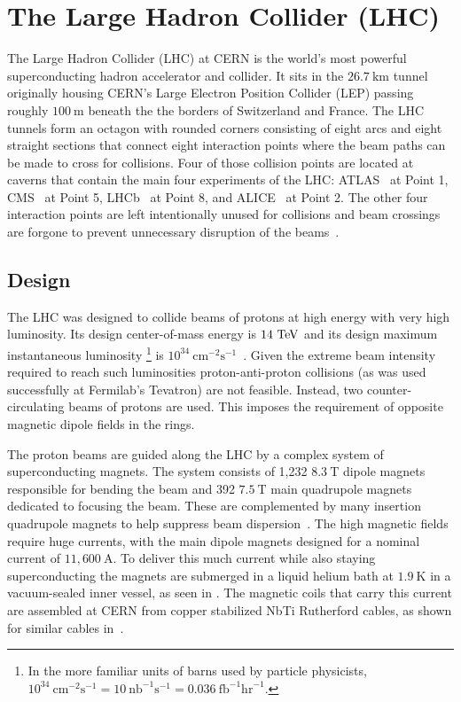 \chapter{The Large Hadron Collider (LHC)}\label{chapter:LHC}

The Large Hadron Collider (\Gls{LHC}) at CERN is the world's most powerful superconducting hadron accelerator and collider.
It sits in the $26.7~\mathrm{km}$ tunnel originally housing CERN's Large Electron Position Collider (LEP) passing roughly $100~\mathrm{m}$ beneath the the borders of Switzerland and France.
The LHC tunnels form an octagon with rounded corners consisting of eight arcs and eight straight sections that connect eight \glspl{interaction point} where the beam paths can be made to cross for collisions.
Four of those collision points are located at caverns that contain the main four experiments of the LHC: ATLAS~\cite{PERF-2007-01} at Point 1, CMS~\cite{CMS:2008} at Point 5, LHCb~\cite{LHCb:2008} at Point 8, and ALICE~\cite{ALICE:2008} at Point 2.
The other four interaction points are left intentionally unused for collisions and beam crossings are forgone to prevent unnecessary disruption of the beams~\cite{Evans:2008}.

\section{Design}

The LHC was designed to collide beams of protons at high energy with very high luminosity.
Its design center-of-mass energy is $14~\mathrm{TeV}{}$ and its design maximum instantaneous luminosity%
\footnote{In the more familiar units of barns used by particle physicists, $10^{34}~\mathrm{cm}^{-2}\mathrm{s}^{-1}=10~\mathrm{nb}^{-1}\mathrm{s}^{-1}=0.036~\mathrm{fb}^{-1}\mathrm{hr}^{-1}$.}
is $10^{34}~\mathrm{cm}^{-2}\mathrm{s}^{-1}$~\cite{Bruning:782076,Evans:2008}.
Given the extreme beam intensity required to reach such luminosities proton-anti-proton collisions (as was used successfully at Fermilab's Tevatron) are not feasible.
Instead, two counter-circulating beams of protons are used.
This imposes the requirement of opposite magnetic dipole fields in the rings.

The proton beams are guided along the LHC by a complex system of superconducting magnets.
The system consists of 1,232 $8.3~\mathrm{T}$ dipole magnets responsible for bending the beam and 392 $7.5~\mathrm{T}$ main quadrupole magnets dedicated to focusing the beam.
These are complemented by many insertion quadrupole magnets to help suppress beam dispersion~\cite{Rossi:2003,Rossi:2004}.
The high magnetic fields require huge currents, with the main dipole magnets designed for a nominal current of $11,600~\mathrm{A}$.
To deliver this much current while also staying superconducting the magnets are submerged in a liquid helium bath at $1.9~\mathrm{K}$ in a vacuum-sealed inner vessel, as seen in .
The magnetic coils that carry this current are assembled at CERN from copper stabilized NbTi Rutherford cables, as shown for similar cables in~\cite{CERN-FOOTAGE-2016-014-001}.

